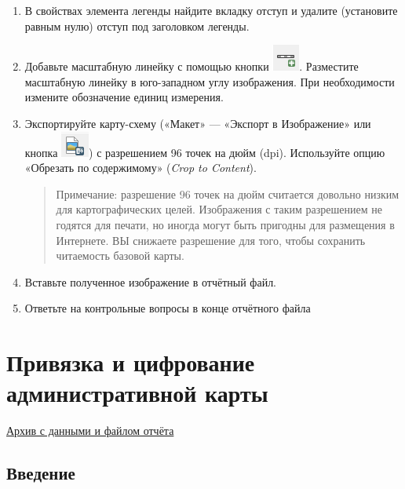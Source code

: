 \documentclass[
  12pt,
]{book}
\begin{document}
\begin{enumerate}
\def\labelenumi{\arabic{enumi}.}
\setcounter{enumi}{9}
\item
  В свойствах элемента легенды найдите вкладку отступ и удалите (установите равным нулю) отступ под заголовком легенды.
\item
  Добавьте масштабную линейку с помощью кнопки \includegraphics{images/Ex05_Vectorization/button_addscalebar.png}. Разместите масштабную линейку в юго-западном углу изображения. При необходимости измените обозначение единиц измерения.
\item
  Экспортируйте карту-схему («Макет» --- «Экспорт в Изображение» или кнопка \includegraphics{images/Ex05_Vectorization/button_exporttoraster.png}) с разрешением 96 точек на дюйм (dpi). Используйте опцию «Обрезать по содержимому» (\emph{Crop to Content}).

  \begin{quote}
  Примечание: разрешение 96 точек на дюйм считается довольно низким для картографических целей. Изображения с таким разрешением не годятся для печати, но иногда могут быть пригодны для размещения в Интернете. ВЫ снижаете разрешение для того, чтобы сохранить читаемость базовой карты.
  \end{quote}
\item
  Вставьте полученное изображение в отчётный файл.
\item
  Ответьте на контрольные вопросы в конце отчётного файла
\end{enumerate}

\hypertarget{map-ref-districts}{%
\chapter{Привязка и цифрование административной карты}\label{map-ref-districts}}

\href{https://1drv.ms/u/s!AmtmZDq3JgxHgZUEDiSdZeUQ-2U9dw?e=kBWcAM}{Архив с данными и файлом отчёта}

\hypertarget{map-ref-districts-intro}{%
\section{Введение}\label{map-ref-districts-intro}}
\end{document}
